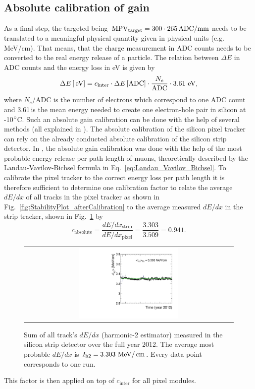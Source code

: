 \subsection*{Absolute calibration of gain}
As a final step, the targeted \mpv being $\,\text{MPV}_{\text{target}}=300 \cdot 265 \,  \text{ADC/mm}$ needs to be translated to a meaningful physical quantity given in physical units (e.g. MeV/cm).
That means, that the charge measurement in ADC counts needs to be converted to the real energy release of a particle.
The relation between $\Delta E$ in ADC counts and the energy loss in eV is given by
\begin{equation*}
\Delta E\,[\,\text{e}\kern-0.06667em\text{V}] = c_{\text{inter}} \cdot \Delta E\,[\text{ADC}] \cdot \frac{N_e}{\text{ADC}} \cdot 3.61 \, \,\text{e}\kern-0.06667em\text{V},
\end{equation*}
where $N_e$/ADC is the number of electrons which correspond to one ADC count and 3.61\,\ev is the  mean energy needed to create one electron-hole pair in silicon at -10$\degree$C.
Such an absolute gain calibration can be done with the help of several methods (all explained in \cite{bib:Quertenmont_2010}).
The absolute calibration of the silicon pixel tracker can rely on the already conducted absolute calibration of the silicon strip detector.
In \cite{bib:Quertenmont_2010}, the absolute gain calibration was done with the help of the most probable energy release per path length of muons, 
theoretically described by the Landau-Vavilov-Bichsel formula in Eq.~\ref{eq:Landau_Vavilov_Bichsel}.  
To calibrate the pixel tracker to the correct energy loss per path length it is therefore sufficient to determine one calibration factor to relate the average $dE/dx$ of all tracks in the pixel tracker as shown in 
Fig.~\ref{fig:StabilityPlot_afterCalibration} to the average measured $dE/dx$ in the strip tracker, shown in Fig.~\ref{fig:StabilityPlot_Strip} by
\begin{equation*}
c_{\text{absolute}} = \frac{dE/dx_{\text{strip}}}{dE/dx_{\text{pixel}}} = \frac{3.303}{3.509} = 0.941.
\end{equation*}
\begin{figure}[!bt]
  \centering 
  \begin{tabular}{c}
  \includegraphics[width=0.49\textwidth]{figures/analysis/PixelCalibration/StabilityPlot_Strip_afterCalibration_withoutStepFits_NEW.pdf}
  \end{tabular}
  \caption{Sum of all track's $dE/dx$ (harmonic-2 estimator) measured in the silicon strip detector over the full year 2012. The average most probable $dE/dx$ is $I_{\text{h2}}=3.303\,\,\text{Me}\kern-0.06667em\text{V}/\,\text{cm}$. Every data point corresponds to one run.} 
  \label{fig:StabilityPlot_Strip}
\end{figure}
This factor is then applied on top of $c_{\text{inter}}$ for all pixel modules.

